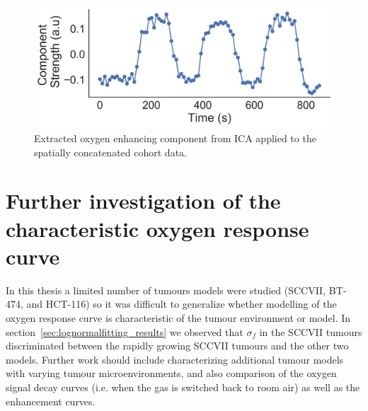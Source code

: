 \begin{figure}[htbp]
   \centering
   \includegraphics[width=\textwidth]{futurework/futurework-images/ISMRM2019_AARTS3_groupICA_OEcomponent.png} %
   \caption{Extracted oxygen enhancing component from \acs{ICA} applied to the spatially concatenated cohort data.
   \label{groupICA1}}
\end{figure}

\section{Further investigation of the characteristic oxygen response curve}

In this thesis a limited number of tumours models were studied (SCCVII, BT-474, and HCT-116) so it was difficult to generalize whether modelling of the oxygen response curve is characteristic of the tumour environment or model. 
In section~\ref{sec:lognormalfitting_results} we observed that $\sigma_f$ in the SCCVII tumours discriminated between the rapidly growing SCCVII tumours and the other two models.
Further work should include characterizing additional tumour models with varying tumour microenvironments, and also comparison of the oxygen signal decay curves (i.e. when the gas is switched back to room air) as well as the enhancement curves.

